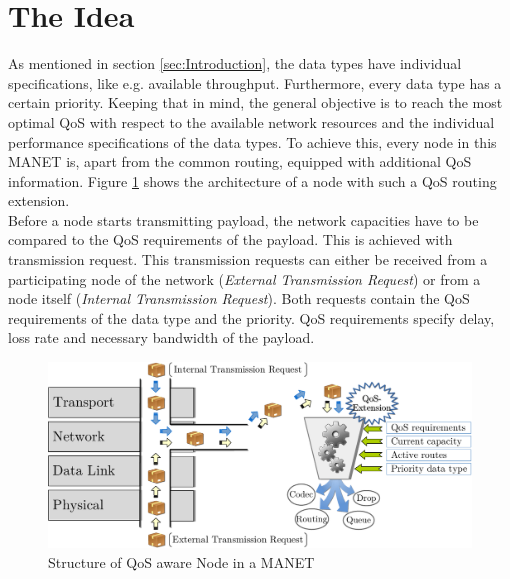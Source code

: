 \documentclass[runningheads]{llncs}
\newcommand{\MANET}{MANET}
\newcommand{\QOS}{QoS}
\begin{document}
	\section{The Idea}
	As mentioned in section \ref{sec:Introduction}, the data types have individual specifications, like e.g. available throughput. Furthermore, every data type has a certain priority. Keeping that in mind, the general objective is to reach the most optimal \QOS{} with respect to the available network resources and the individual performance specifications of the data types. To achieve this, every node in this \MANET{} is, apart from the common routing, equipped with additional \QOS{} information. Figure \ref{fig:QoSDecision} shows the architecture of a node with such a \QOS{} routing extension.\\
	Before a node starts transmitting payload, the network capacities have to be compared to the \QOS{} requirements of the payload. This is achieved with transmission request. This transmission requests can either be received from a participating node of the network (\textit{External Transmission Request}) or from a node itself (\textit{Internal Transmission Request}). Both requests contain the \QOS{} requirements of the data type and the priority. \QOS{} requirements specify delay, loss rate and necessary bandwidth of the payload. 
	\begin{figure}[h]
		\centering
		\includegraphics[width=\textwidth]{figures/QoSDecision.pdf}
		\caption{Structure of \QOS{} aware Node in a \MANET{}}
		\label{fig:QoSDecision}
	\end{figure}
\end{document}
